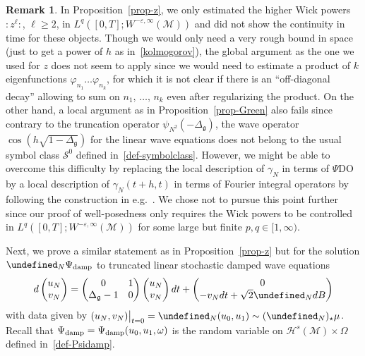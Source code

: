\documentclass[10pt]{amsart}
\theoremstyle{definition}\newtheorem{defi}[theo]{Definition}\newtheorem{rema}[theo]{Remark}\newtheorem{exam}[theo]{Example}\newtheorem{exem}[theo]{Example}\newtheorem{nota}[theo]{Notation}
\newcommand{\damp}{\textup{damp}}
\let\P= \undefined
\newcommand{\P}{\mathbf{P}}
\renewcommand{\S}{\mathcal{S}}
\newcommand{\M}{\mathcal{M}}
\renewcommand{\H}{\mathcal{H}}
\newcommand{\g}{\mathfrak{g}}
\newcommand{\Dlg}{\Delta_{\g}}
\newcommand{\eps}{\varepsilon}
\renewcommand{\o}{\omega}
\renewcommand{\O}{\Omega}
\begin{document}
\begin{rema}\label{rk-FIO}
In Proposition~\ref{prop-z}, we only estimated the higher Wick powers~$:z^{\ell}:$, $\ell \geq 2$, in $L^q([0,T];W^{-\eps,\infty}(\M))$ and did not show the continuity in time for these objects. Though we would only need a very rough bound in space (just to get a power of $h$ as in~\eqref{kolmogorov}), the global argument as the one we used for $z$ does not seem to apply since we would need to estimate a product of $k$ eigenfunctions $\varphi_{n_1}\dots \varphi_{n_k}$, for which it is not clear if there is an ``off-diagonal decay'' allowing to sum on $n_1,\,\dots,\,n_k$ even after regularizing the product. On the other hand, a local argument as in Proposition~\ref{prop-Green} also fails since contrary to the truncation operator $\psi_{N^2}(-\Dlg)$, the wave operator $\cos(h\sqrt{1-\Dlg})$ for the linear wave equations does not belong to the usual symbol class $\S^0$ defined in~\eqref{def-symbolclass}. However, we might be able to overcome this difficulty by replacing the local description of $\gamma_N$ in terms of $\Psi$DO by a local description of $\gamma_N(t+h,t)$ in terms of Fourier integral operators by following the construction in e.g.~\cite{BGT,MSS}. We chose not to pursue this point further since our proof of well-posedness only requires the Wick powers to be controlled in $L^q([0,T];W^{-\eps,\infty}(\M))$ for some large but finite $p,q\in [1,\infty)$.
\end{rema}

Next, we prove a similar statement as in Proposition~\ref{prop-z} but for the solution $\P_N\Psi_\damp$ to truncated linear stochastic damped wave equations
\begin{equation}\label{truncLSDNLW}
d
\begin{pmatrix}
u_N\\v_N
\end{pmatrix} =
\begin{pmatrix}
0& 1\\\Dlg-1&0
\end{pmatrix}
\begin{pmatrix}
u_N\\v_N
\end{pmatrix}dt +
\begin{pmatrix}
0\\- v_Ndt+\sqrt{2}\P_NdB
\end{pmatrix}
\end{equation}
with data given by $(u_N,v_N)\big|_{t=0}=\P_N(u_0,u_1)\sim (\P_N)_{\star}\mu$. Recall that $\Psi_\damp\linebreak=\Psi_\damp(u_0,u_1,\o)$ is the random variable on $\H^s(\M)\times\O$ defined in~\eqref{def-Psidamp}.
\end{document}
